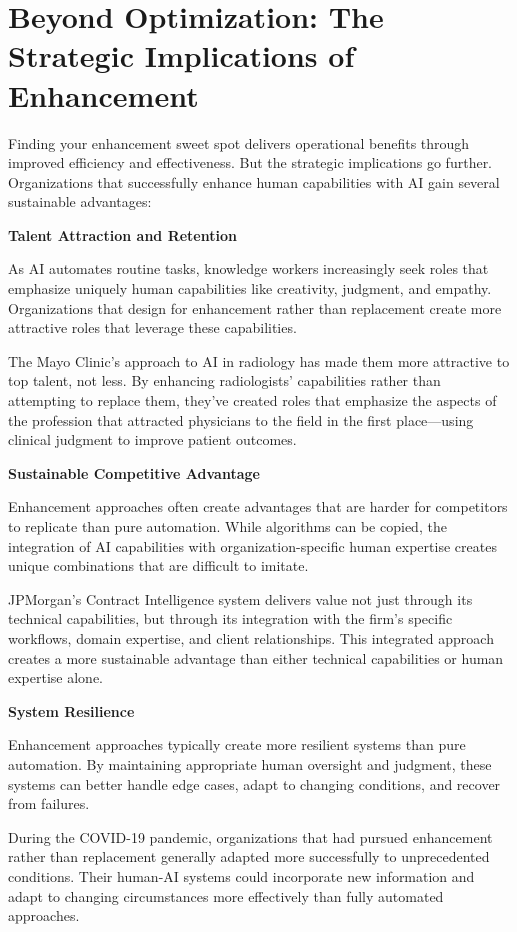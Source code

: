 \documentclass[
  Letterpaper,
]{scrbook}
\begin{document}
\section{Beyond Optimization: The Strategic Implications of
Enhancement}\label{beyond-optimization-the-strategic-implications-of-enhancement}

Finding your enhancement sweet spot delivers operational benefits
through improved efficiency and effectiveness. But the strategic
implications go further. Organizations that successfully enhance human
capabilities with AI gain several sustainable advantages:

\textbf{Talent Attraction and Retention}

As AI automates routine tasks, knowledge workers increasingly seek roles
that emphasize uniquely human capabilities like creativity, judgment,
and empathy. Organizations that design for enhancement rather than
replacement create more attractive roles that leverage these
capabilities.

The Mayo Clinic's approach to AI in radiology has made them more
attractive to top talent, not less. By enhancing radiologists'
capabilities rather than attempting to replace them, they've created
roles that emphasize the aspects of the profession that attracted
physicians to the field in the first place---using clinical judgment to
improve patient outcomes.

\textbf{Sustainable Competitive Advantage}

Enhancement approaches often create advantages that are harder for
competitors to replicate than pure automation. While algorithms can be
copied, the integration of AI capabilities with organization-specific
human expertise creates unique combinations that are difficult to
imitate.

JPMorgan's Contract Intelligence system delivers value not just through
its technical capabilities, but through its integration with the firm's
specific workflows, domain expertise, and client relationships. This
integrated approach creates a more sustainable advantage than either
technical capabilities or human expertise alone.

\textbf{System Resilience}

Enhancement approaches typically create more resilient systems than pure
automation. By maintaining appropriate human oversight and judgment,
these systems can better handle edge cases, adapt to changing
conditions, and recover from failures.

During the COVID-19 pandemic, organizations that had pursued enhancement
rather than replacement generally adapted more successfully to
unprecedented conditions. Their human-AI systems could incorporate new
information and adapt to changing circumstances more effectively than
fully automated approaches.
\end{document}
